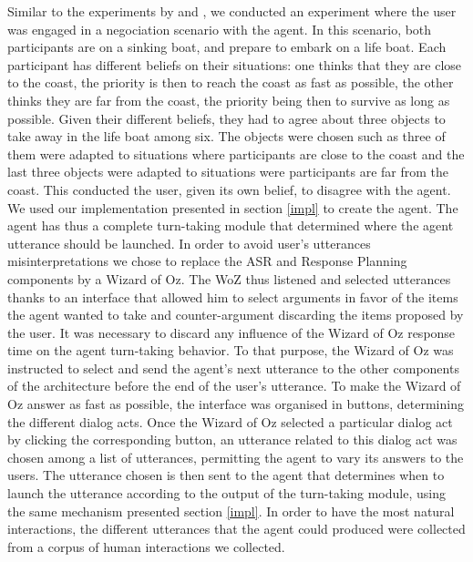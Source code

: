Similar to the experiments by \cite{de_vault_toward_2015} and \citep{skantze_towards_2010}, we conducted an experiment where the user was engaged in a negociation scenario with the agent. In this scenario, both participants are on a sinking boat, and prepare to embark on a life boat. Each participant has different beliefs on their situations: one thinks that they are close to the coast, the priority is then to reach the coast as fast as possible, the other thinks they are far from the coast, the priority being then to survive as long as possible. Given their different beliefs, they had to agree about three objects to take away in the life boat among six. The objects were chosen such as three of them were adapted to situations where participants are close to the coast and the last three objects were adapted to situations were participants are far from the coast. This conducted the user, given its own belief, to disagree with the agent.   
We used our implementation presented in section \ref{impl} to create the agent. The agent has thus a complete turn-taking module that determined where the agent utterance should be launched. In order to avoid user's utterances misinterpretations we chose to replace the ASR and Response Planning components by a Wizard of Oz. The WoZ thus listened and selected utterances thanks to an interface that allowed him to select arguments in favor of the items the agent wanted to take and counter-argument discarding the items proposed by the user. It was necessary to discard any influence of the Wizard of Oz response time on the agent turn-taking behavior. To that purpose, the Wizard of Oz was instructed to select and send the agent's next utterance to the other components of the architecture before the end of the user's utterance. To make the Wizard of Oz answer as fast as possible, the interface was organised in buttons, determining the different dialog acts. Once the Wizard of Oz selected a particular dialog act by clicking the corresponding button, an utterance related to this dialog act was chosen among a list of utterances, permitting the agent to vary its answers to the users. The utterance chosen is then sent to the agent that determines when to launch the utterance according to the output of the turn-taking module, using the same mechanism presented section \ref{impl}. In order to have the most natural interactions, the different utterances that the agent could produced were collected from a corpus of human interactions we collected. 

